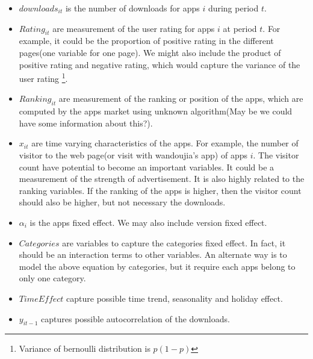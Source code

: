 \documentclass[11pt,twoside]{article}
\begin{document}
\begin{itemize}
	\item $downloads_{it}$ is the number of downloads for apps $i$ during period $t$.
	\item $Rating_{it}$ are measurement of the user rating for apps $i$ at period $t$. For example, it could be the proportion of positive rating in the different pages(one variable for one page). We might also include the product of positive rating and negative rating, which would capture the variance of the user rating \footnote{Variance of bernoulli distribution is $p(1-p)$}. 
	\item $Ranking_{it}$ are measurement of the ranking or position of the apps, which are computed by the apps market using unknown algorithm(May be we could have some information about this?). 
	\item $x_{it}$ are time varying characteristics of the apps. For example, the number of visitor to the web page(or visit with wandoujia's app) of apps $i$. The visitor count have potential to become an important variables. It could be a measurement of the strength of advertisement. It is also highly related to the ranking variables. If the ranking of the apps is higher, then the visitor count should also be higher, but not necessary the downloads. 
	\item $\alpha_i$ is the apps fixed effect. We may also include version fixed effect.
	\item $Categories$ are variables to capture the categories fixed effect. In fact, it should be an interaction terms to other variables. An alternate way is to model the above equation by categories, but it require each apps belong to only one category.
	\item $TimeEffect$ capture possible time trend, seasonality and holiday effect. 
	\item $y_{it-1}$ captures possible autocorrelation of the downloads. 
\end{itemize}
\end{document}
